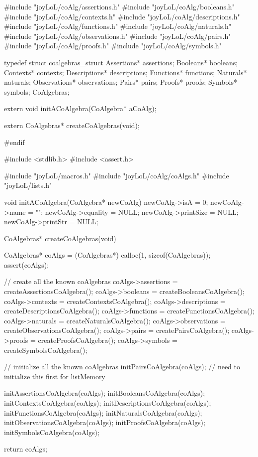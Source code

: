 #include "joyLoL/coAlg/assertions.h"
#include "joyLoL/coAlg/booleans.h"
#include "joyLoL/coAlg/contexts.h"
#include "joyLoL/coAlg/descriptions.h"
#include "joyLoL/coAlg/functions.h"
#include "joyLoL/coAlg/naturals.h"
#include "joyLoL/coAlg/observations.h"
#include "joyLoL/coAlg/pairs.h"
#include "joyLoL/coAlg/proofs.h"
#include "joyLoL/coAlg/symbols.h"

typedef struct coalgebras_struct {
  Assertions*    assertions;
  Booleans*      booleans;
  Contexts*      contexts;
  Descriptions*  descriptions;
  Functions*     functions;
  Naturals*      naturals;
  Observations*  observations;
  Pairs*         pairs;
  Proofs*        proofs;
  Symbols*       symbols;
} CoAlgebras;

extern void initACoAlgebra(CoAlgebra* aCoAlg);

extern CoAlgebras* createCoAlgebras(void);

#endif
\stopCHeader

\startCCode
#include <stdlib.h>
#include <assert.h>

#include "joyLoL/macros.h"
#include "joyLoL/coAlg/coAlgs.h"
#include "joyLoL/lists.h"

void initACoAlgebra(CoAlgebra* newCoAlg) {
  newCoAlg->isA       = 0;
  newCoAlg->name      = "";
  newCoAlg->equality  = NULL;
  newCoAlg->printSize = NULL;
  newCoAlg->printStr  = NULL;
}

CoAlgebras* createCoAlgebras(void) {
  CoAlgebras* coAlgs = (CoAlgebras*) calloc(1, sizeof(CoAlgebras));
  assert(coAlgs);


  // create all the known coAlgebras
  coAlgs->assertions    = createAssertionsCoAlgebra();
  coAlgs->booleans      = createBooleansCoAlgebra();
  coAlgs->contexts      = createContextsCoAlgebra();
  coAlgs->descriptions  = createDescriptionsCoAlgebra();
  coAlgs->functions     = createFunctionsCoAlgebra();
  coAlgs->naturals      = createNaturalsCoAlgebra();
  coAlgs->observations  = createObservationsCoAlgebra();
  coAlgs->pairs         = createPairsCoAlgebra();
  coAlgs->proofs        = createProofsCoAlgebra();
  coAlgs->symbols       = createSymbolsCoAlgebra();

  // initialize all the known coAlgebras
  initPairsCoAlgebra(coAlgs); // need to initialize this first for listMemory

  initAssertionsCoAlgebra(coAlgs);
  initBooleansCoAlgebra(coAlgs);
  initContextsCoAlgebra(coAlgs);
  initDescriptionsCoAlgebra(coAlgs);
  initFunctionsCoAlgebra(coAlgs);
  initNaturalsCoAlgebra(coAlgs);
  initObservationsCoAlgebra(coAlgs);
  initProofsCoAlgebra(coAlgs);
  initSymbolsCoAlgebra(coAlgs);

  return coAlgs;
}
\stopCCode


